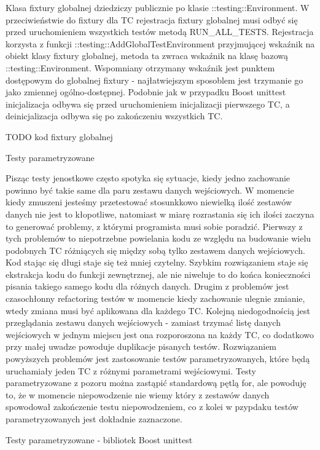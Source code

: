 Klasa fixtury globalnej dziedziczy publicznie po klasie ::testing::Environment. W przeciwieństwie do fixtury dla TC rejestracja fixtury globalnej musi odbyć się przed uruchomieniem wszystkich testów metodą RUN_ALL_TESTS.
Rejestracja korzysta z funkcji ::testing::AddGlobalTestEnvironment przyjmującej wskaźnik na obiekt klasy fixtury globalnej, metoda ta zwraca wskaźnik na klasę bazową ::testing::Environment. 
Wspomniany otrzymany wskaźnik jest punktem dostępowym do globalnej fixtury - najłatwiejszym sposoblem jest trzymanie go jako zmiennej ogólno-dostępnej.
Podobnie jak w przypadku Boost unittest inicjalizacja odbywa się przed uruchomieniem inicjalizacji pierwszego TC, a deinicjalizacja odbywa się po zakończeniu wszystkich TC.

TODO kod fixtury globalnej

Testy parametryzowane

Pisząc testy jenostkowe często spotyka się sytuacje, kiedy jedno zachowanie powinno być takie same dla paru zestawu danych wejściowych. W momencie kiedy zmuszeni jesteśmy przetestować stosunkkowo niewielką ilość zestawów danych nie jest to kłopotliwe, natomiast w miarę rozrastania się ich ilości zaczyna to generować problemy, z którymi programista musi sobie poradzić.
Pierwszy z tych problemów to niepotrzebne powielania kodu ze względu na budowanie wielu podobnych TC różniących się między sobą tylko zestawem danych wejściowych. Kod stając się długi staje się też mniej czytelny.
Szybkim rozwiązaniem staje się ekstrakcja kodu do funkcji zewnętrznej, ale nie niweluje to do końca konieczności pisania takiego samego kodu dla różnych danych.
Drugim z problemów jest czasochłonny refactoring testów w momencie kiedy zachowanie ulegnie zmianie, wtedy zmiana musi być aplikowana dla każdego TC.
Kolejną niedogodnością jest przeglądania zestawu danych wejściowych - zamiast trzymać listę danych wejściowych w jednym miejscu jest ona rozporoszona na każdy TC, co dodatkowo przy małej uwadze powoduje duplikacje pisanych testów.
Rozwiązaniem powyższych problemów jest zastosowanie testów parametryzowanych, które będą uruchamiały jeden TC z różnymi parametrami wejściowymi. 
Testy parametryzowane z pozoru można zastąpić standardową pętlą for, ale powoduję to, że w momencie niepowodzenie nie wiemy który z zestawów danych spowodował zakończenie testu niepowodzeniem, co z kolei w pzypdaku testów parametryzowanych jest dokładnie zaznaczone.

Testy parametryzowane - bibliotek Boost unittest


